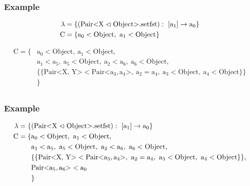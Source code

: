 \documentclass[aspectratio=169]{beamer}
\begin{document}
\begin{frame}[fragile]
    \frametitle{Example}
    \begin{align*}
        \lambda &= \{ ( \cxnm{Pair}{X}{Object}{setfst} ): \ [\text{a}_1] \to \text{a}_0 \}\\
        \text{C} &= \{ \text{a}_0 < \text{Object}, \ \text{a}_1 < \text{Object} \}\\
    \end{align*}

    \begin{align*}
        \text{C} = \{& \text{a}_0 < \text{Object}, \ \text{a}_1 < \text{Object}, \\
        &\text{a}_1 < \text{a}_5, \ \text{a}_5 < \text{Object}, \ \text{a}_2 < \text{a}_6, \ \text{a}_6 < \text{Object}, \\
        & \{ \{ \text{Pair<X, Y>} < \text{Pair<} \text{a}_3, \text{a}_4 \text{>}, \ \text{a}_2 = \text{a}_4, \ \text{a}_3 < \text{Object}, \ \text{a}_4 < \text{Object} \} \} \\
        &\}\\
    \end{align*}
\end{frame}

\begin{frame}[fragile]
    \frametitle{Example}
    \begin{align*}
        \lambda = \{& ( \cxnm{Pair}{X}{Object}{setfst} ): \ [\text{a}_1] \to \text{a}_0 \}\\
        \text{C} = \{& \text{a}_0 < \text{Object}, \ \text{a}_1 < \text{Object}, \\
        &\text{a}_1 < \text{a}_5, \ \text{a}_5 < \text{Object}, \ \text{a}_2 < \text{a}_6, \ \text{a}_6 < \text{Object}, \\
        & \{ \{ \text{Pair<X, Y>} < \text{Pair<} \text{a}_3, \text{a}_4 \text{>}, \ \text{a}_2 = \text{a}_4, \ \text{a}_3 < \text{Object}, \ \text{a}_4 < \text{Object} \} \},\\
        &\text{Pair<}\text{a}_5, \text{a}_6\text{>} < \text{a}_0\\
        &\}\\
    \end{align*}
\end{frame}
\end{document}

